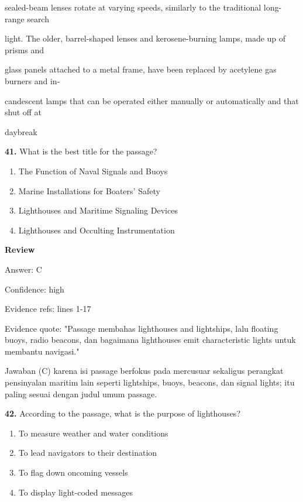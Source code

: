 \documentclass[12pt]{article}
\begin{document}
sealed-beam lenses rotate at varying speeds, similarly to the traditional long-range search\par
light. The older, barrel-shaped lenses and kerosene-burning lamps, made up of prisms and\par
glass panels attached to a metal frame, have been replaced by acetylene gas burners and in-\par
candescent lamps that can be operated either manually or automatically and that shut off at\par
daybreak\par
\endgroup
\medskip
\noindent\textbf{41.} What is the best title for the passage?
\begin{enumerate}[label=(\Alph*),leftmargin=*,itemsep=0.2em]
\item The Function of Naval Signals and Buoys
\item Marine Installations for Boaters' Safety
\item Lighthouses and Maritime Signaling Devices
\item Lighthouses and Occulting Instrumentation
\end{enumerate}
\par
\begingroup
\setlength{\parskip}{0pt}
\setlength{\parindent}{0pt}
\textbf{Review}\par
Answer: C\par
Confidence: high\par
Evidence refs: lines 1-17\par
Evidence quote: "Passage membahas lighthouses and lightships, lalu floating buoys, radio beacons, dan bagaimana lighthouses emit characteristic lights untuk membantu navigasi."\par
Jawaban (C) karena isi passage berfokus pada mercusuar sekaligus perangkat pensinyalan maritim lain seperti lightships, buoys, beacons, dan signal lights; itu paling sesuai dengan judul umum passage.\par
\endgroup
\par
\vspace{0.25\baselineskip}
\noindent\textbf{42.} According to the passage, what is the purpose of lighthouses?
\begin{enumerate}[label=(\Alph*),leftmargin=*,itemsep=0.2em]
\item To measure weather and water conditions
\item To lead navigators to their destination
\item To flag down oncoming vessels
\item To display light-coded messages
\end{enumerate}
\end{document}
